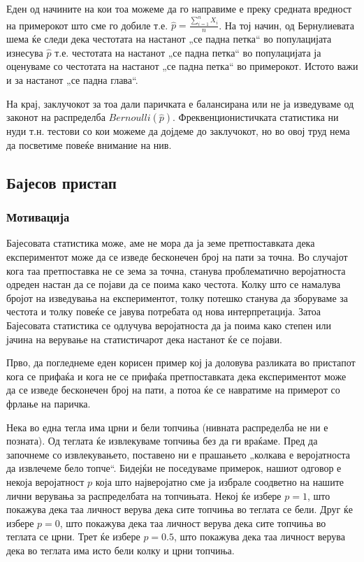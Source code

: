\documentclass[12pt]{article}
\numberwithin{equation}{section}
\begin{document}
Еден од начините на кои тоа можеме да го направиме е преку средната вредност на примерокот што сме го добиле т.е. \(\widehat{p} = \frac{\sum_{i=1}^{n} X_i}{n}\). На тој начин, од Бернулиевата шема ќе следи дека честотата на настанот „се падна петка“ во популацијата изнесува \(\widehat{p}\) т.е. честотата на настанот „се падна петка“ во популацијата ја оценуваме со честотата на настанот „се падна петка“ во примерокот. Истото важи и за настанот „се падна глава“.

На крај, заклучокот за тоа дали паричката е балансирана или не ја изведуваме од законот на распределба \(Bernoulli(\widehat{p})\). Фреквенционистичката статистика ни нуди т.н. тестови со кои можеме да дојдеме до заклучокот, но во овој труд нема да посветиме повеќе внимание на нив.

\subsection{Бајесов пристап}

\subsubsection{Мотивација}

Бајесовата статистика може, аме не мора да ја земе претпоставката дека експериментот може да се изведе бесконечен број на пати за точна. Во случајот кога таа претпоставка не се зема за точна, станува проблематично веројатноста одреден настан да се појави да се поима како честота. Колку што се намалува бројот на изведувања на експериментот, толку потешко станува да зборуваме за честота и толку повеќе се јавува потребата од нова интерпретација. Затоа Бајесовата статистика се одлучува веројатноста да ја поима како степен или јачина на верување на статистичарот дека настанот ќе се појави.

Прво, да погледнеме еден корисен пример кој ја доловува разликата во пристапот кога се прифаќа и кога не се прифаќа претпоставката дека експериментот може да се изведе бесконечен број на пати, а потоа ќе се навратиме на примерот со фрлање на паричка.

Нека во една тегла има црни и бели топчиња (нивната распределба не ни е позната). Од теглата ќе извлекуваме топчиња без да ги враќаме. Пред да започнеме со извлекувањето, поставено ни е прашањето „колкава е веројатноста да извлечеме бело топче“. Бидејќи не поседуваме примерок, нашиот одговор е некоја веројатност \(p\) која што најверојатно сме ја избрале соодветно на нашите лични верувања за распределбата на топчињата. Некој ќе избере \(p=1\), што покажува дека таа личност верува дека сите топчиња во теглата се бели. Друг ќе избере \(p=0\), што покажува дека таа личност верува дека сите топчиња во теглата се црни. Трет ќе избере \(p=0.5\), што покажува дека таа личност верува дека во теглата има исто бели колку и црни топчиња.
\end{document}
